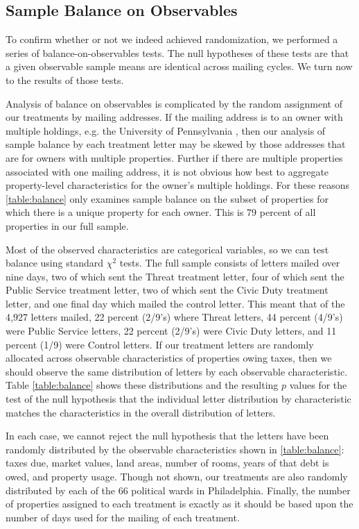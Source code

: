 \documentclass[12pt,titlepage]{article}
\begin{document}
\subsection{Sample Balance on Observables}

To confirm whether or not we indeed achieved randomization, we
performed a series of balance-on-observables tests. The null
hypotheses of these tests are that a given observable sample means are
identical across mailing cycles. We turn now to the results of those
tests.

Analysis of balance on observables is complicated by the random
assignment of our treatments by mailing addresses.  If the mailing
address is to an owner with multiple holdings, e.g. the University
of Pennsylvania , then our analysis of sample balance by each
treatment letter may be skewed by those addresses that are for owners
with multiple properties.  Further if there are multiple properties
associated with one mailing address, it is not obvious how best to
aggregate property-level characteristics for the owner's multiple
holdings.  For these reasons \ref{table:balance} only examines sample
balance on the subset of properties for which there is a unique
property for each owner.  This is 79 percent of all properties in our
full sample.
  
Most of the observed characteristics are categorical variables, so we
can test balance using standard $\chi^2$ tests. The full sample
consists of letters mailed over nine days, two of which sent the
Threat treatment letter, four of which sent the Public Service
treatment letter, two of which sent the Civic Duty treatment letter,
and one final day which mailed the control letter.  This meant that of
the 4,927 letters mailed, 22 percent (2/9's) where Threat letters, 44
percent (4/9's) were Public Service letters, 22 percent (2/9's) were
Civic Duty letters, and 11 percent (1/9) were Control letters.  If our
treatment letters are randomly allocated across observable
characteristics of properties owing taxes, then we should observe the
same distribution of letters by each observable characteristic.  Table
\ref{table:balance} shows these distributions and the resulting $p$
values for the test of the null hypothesis that the individual letter
distribution by characteristic matches the characteristics in the
overall distribution of letters.

In each case, we cannot reject the null hypothesis that the letters
have been randomly distributed by the observable characteristics shown
in \ref{table:balance}: taxes due, market values, land areas, number
of rooms, years of that debt is owed, and property usage.  Though not
shown, our treatments are also randomly distributed by each of the 66
political wards in Philadelphia.  Finally, the number of properties
assigned to each treatment is exactly as it should be based upon the
number of days used for the mailing of each treatment.
\end{document}
